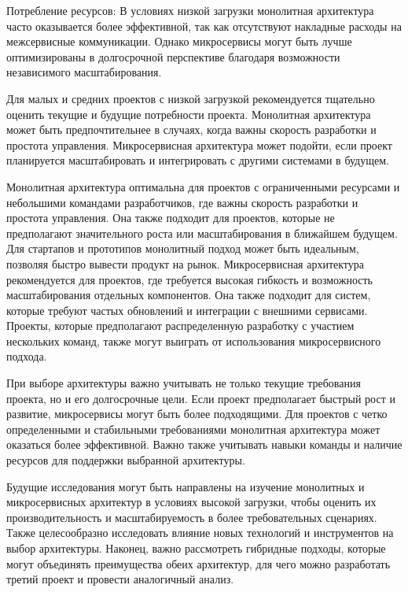    Потребление ресурсов: В условиях низкой загрузки монолитная архитектура часто оказывается более эффективной, так как отсутствуют накладные расходы на межсервисные коммуникации. Однако микросервисы могут быть лучше оптимизированы в долгосрочной перспективе благодаря возможности независимого масштабирования.
    
    Для малых и средних проектов с низкой загрузкой рекомендуется тщательно оценить текущие и будущие потребности проекта. Монолитная архитектура может быть предпочтительнее в случаях, когда важны скорость разработки и простота управления. Микросервисная архитектура может подойти, если проект планируется масштабировать и интегрировать с другими системами в будущем.
    
    Монолитная архитектура оптимальна для проектов с ограниченными ресурсами и небольшими командами разработчиков, где важны скорость разработки и простота управления. Она также подходит для проектов, которые не предполагают значительного роста или масштабирования в ближайшем будущем. Для стартапов и прототипов монолитный подход может быть идеальным, позволяя быстро вывести продукт на рынок. Микросервисная архитектура рекомендуется для проектов, где требуется высокая гибкость и возможность масштабирования отдельных компонентов. Она также подходит для систем, которые требуют частых обновлений и интеграции с внешними сервисами. Проекты, которые предполагают распределенную разработку с участием нескольких команд, также могут выиграть от использования микросервисного подхода.
    
    При выборе архитектуры важно учитывать не только текущие требования проекта, но и его долгосрочные цели. Если проект предполагает быстрый рост и развитие, микросервисы могут быть более подходящими. Для проектов с четко определенными и стабильными требованиями монолитная архитектура может оказаться более эффективной. Важно также учитывать навыки команды и наличие ресурсов для поддержки выбранной архитектуры.
    
    Будущие исследования могут быть направлены на изучение монолитных и микросервисных архитектур в условиях высокой загрузки, чтобы оценить их производительность и масштабируемость в более требовательных сценариях. Также целесообразно исследовать влияние новых технологий и инструментов на выбор архитектуры. Наконец, важно рассмотреть гибридные подходы, которые могут объединять преимущества обеих архитектур, для чего можно разработать третий проект и провести аналогичный анализ.

\clearpage